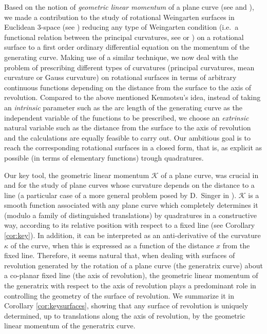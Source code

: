 \documentclass[leqno,11pt]{amsart}
\theoremstyle{definition}
\numberwithin{equation}{section}
\begin{document}
Based on the notion of {\em geometric linear momentum} of a plane curve (see \cite{CCI16} and \cite{CCIs20}), we made a contribution to the study of rotational Weingarten surfaces in Euclidean 3-space (see \cite{CC22}) reducing any type of Weingarten condition (i.e.\ a functional relation between the principal curvatures, see \cite{W61} or \cite{Ch45}) on a rotational surface to a first order ordinary differential equation on the momentum of the generating curve. 
Making use of a similar technique, we now deal with the problem of prescribing different types of curvatures (principal curvatures, mean curvature or Gauss curvature) on rotational surfaces in terms of arbitrary continuous functions depending on the distance from the surface to the axis of revolution. 
Compared to the above mentioned Kenmotsu's idea, instead of taking an \textit{intrinsic} parameter such as the arc length of the generating curve as the independent variable of the functions to be prescribed, we choose an \textit{extrinsic} natural variable such as the distance from the surface to the axis of revolution and the calculations are equally feasible to carry out. Our ambitious goal is to reach the corresponding rotational surfaces in a closed form, that is, as explicit as possible (in terms of elementary functions) trough quadratures.

Our key tool, the geometric linear momentum $\mathcal K$ of a plane curve, was crucial in \cite{CCI16} and \cite{CCIs20} for the study of plane curves whose curvature depends on the distance to a line (a particular case of a more general problem posed by D.~Singer in \cite{S99}). $\mathcal K$ is a smooth function associated with any plane curve which completely determines it (modulo a family of distinguished translations) by quadratures in a constructive way, according to its relative position with respect to a fixed line (see Corollary \ref{cor:key}). 
In addition, it can be interpreted as an anti-derivative of the curvature $\kappa $ of the curve, when this is expressed as a function of the distance $x$ from the fixed line. Therefore, it seems natural that, when dealing with surfaces of revolution generated by the rotation of a plane curve (the generatrix curve) about a co-planar fixed line (the axis of revolution), the geometric linear momentum of the generatrix with respect to the axis of revolution plays a predominant role in controlling the geometry of the surface of revolution. We summarize it in Corollary \ref{cor:keysurfaces}, showing that any surface of revolution is uniquely determined, up to translations along the axis of revolution, by the geometric linear momentum of the generatrix curve. 
\end{document}
